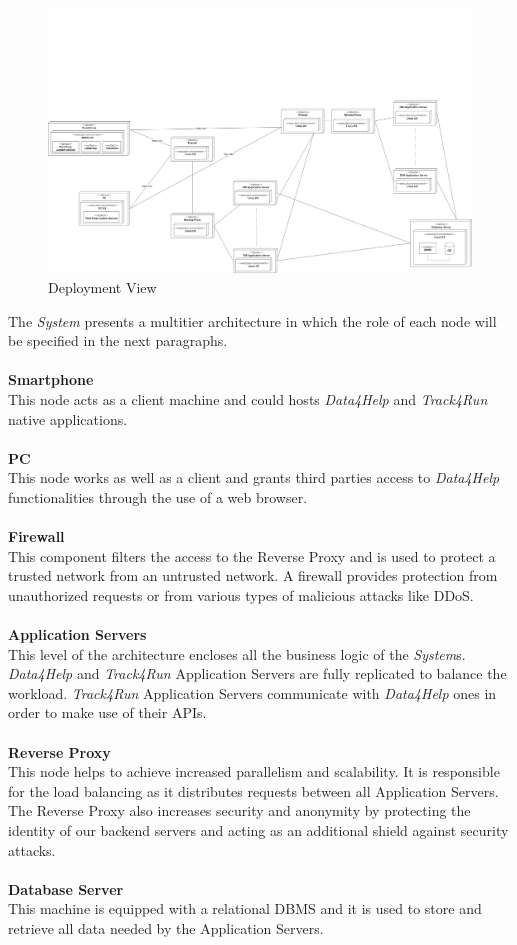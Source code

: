 \documentclass[titlepage]{article}
\begin{document}
\begin{figure}[H]
	\center
  	\includegraphics[width=15cm]{Deployment.png}
  	\caption{Deployment View}
 	\label{fig:DEPVIEW}
\end{figure}
\noindent
The {\it System} presents a multitier architecture in which the role of each node will be specified in the next paragraphs. \\ \\
{\bf Smartphone }\\ 
This node acts as a client machine and could hosts {\it Data4Help} and {\it Track4Run} native applications. \\ \\
{\bf PC }\\ 
This node works as well as a client and grants third parties access to {\it Data4Help} functionalities through the use of a web browser.\\ \\
{\bf Firewall }\\ 
This component filters the access to the Reverse Proxy and is used to protect a trusted network from an untrusted network. A firewall provides protection from unauthorized requests or from various types of malicious attacks like DDoS.\\ \\
{\bf Application Servers }\\ 
This level of the architecture encloses all the business logic of the {\it System}s. {\it Data4Help} and {\it Track4Run} Application Servers are fully replicated to balance the workload. {\it Track4Run} Application Servers communicate with {\it Data4Help} ones in order to make use of their APIs.\\ \\
{\bf Reverse Proxy }\\ 
This node helps to achieve increased parallelism and scalability. It is responsible for the load balancing as it distributes requests between all Application Servers. The Reverse Proxy also increases security and anonymity by protecting the identity of our backend servers and acting as an additional shield against security attacks.\\ \\
{\bf Database Server }\\ 
This machine is equipped with a relational DBMS and it is used to store and retrieve all data needed by the Application Servers. 
\end{document}
